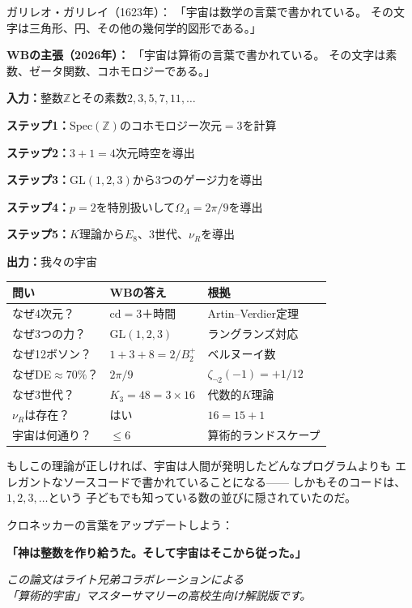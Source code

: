 \documentclass[12pt,a4paper]{article}
\begin{document}
\begin{keybox}[ガリレオの言葉の更新]
ガリレオ・ガリレイ（1623年）：
「宇宙は数学の言葉で書かれている。
その文字は三角形、円、その他の幾何学的図形である。」

\textbf{WBの主張（2026年）：}
「宇宙は算術の言葉で書かれている。
その文字は素数、ゼータ関数、コホモロジーである。」
\end{keybox}

\begin{ideabox}

\textbf{入力：}整数$\mathbb{Z}$とその素数$2, 3, 5, 7, 11, \ldots$

\textbf{ステップ1：}$\mathrm{Spec}(\mathbb{Z})$のコホモロジー次元$=3$を計算

\textbf{ステップ2：}$3+1=4$次元時空を導出

\textbf{ステップ3：}$\mathrm{GL}(1,2,3)$から3つのゲージ力を導出

\textbf{ステップ4：}$p=2$を特別扱いして$\Omega_\Lambda = 2\pi/9$を導出

\textbf{ステップ5：}$K$理論から$E_8$、3世代、$\nu_R$を導出

\textbf{出力：}我々の宇宙
\end{ideabox}

\begin{center}
\begin{tabular}{p{4cm}p{4cm}p{4cm}}
\toprule
\textbf{問い} & \textbf{WBの答え} & \textbf{根拠} \\
\midrule
なぜ4次元？ & $\mathrm{cd}=3$＋時間 & Artin--Verdier定理 \\
なぜ3つの力？ & $\mathrm{GL}(1,2,3)$ & ラングランズ対応 \\
なぜ12ボソン？ & $1+3+8=2/B_2^+$ & ベルヌーイ数 \\
なぜDE$\approx 70\%$？ & $2\pi/9$ & $\zeta_{\neg2}(-1)=+1/12$ \\
なぜ3世代？ & $K_3=48=3\times 16$ & 代数的$K$理論 \\
$\nu_R$は存在？ & はい & $16 = 15+1$ \\
宇宙は何通り？ & $\le 6$ & 算術的ランドスケープ \\
\bottomrule
\end{tabular}
\end{center}

\begin{funbox}[最後に]
もしこの理論が正しければ、宇宙は人間が発明したどんなプログラムよりも
エレガントなソースコードで書かれていることになる——
しかもそのコードは、$1, 2, 3, \ldots$という
子どもでも知っている数の並びに隠されていたのだ。

クロネッカーの言葉をアップデートしよう：

\textbf{「神は整数を作り給うた。そして宇宙はそこから従った。」}
\end{funbox}

\vspace{1cm}

\begin{center}
\textit{この論文はライト兄弟コラボレーションによる\\
「算術的宇宙」マスターサマリーの高校生向け解説版です。}
\end{center}
\end{document}
